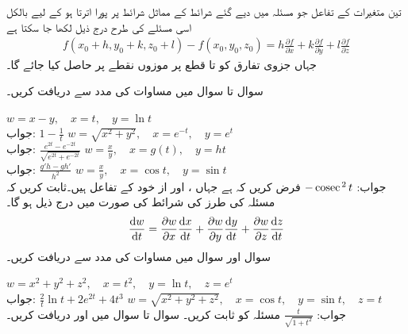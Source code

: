 تین متغیرات کے تفاعل  جو مسئلہ  میں دیے گئے شرائط کے مماثل شرائط پر پورا اترتا ہو کے لیے بالکل اسی مسئلے کی طرح درج ذیل لکھا جا سکتا ہے
\begin{align}\label{مساوات_الاحصاء_مسئلہ_زنجیری_ت}
f(x_0+h,y_0+k,z_0+l)-f(x_0,y_0,z_0)=h\frac{\partial f}{\partial x}+k\frac{\partial f}{\partial y}+l\frac{\partial f}{\partial z}
\end{align}
جہاں جزوی تفارق کو  تا  قطع پر موزوں نقطے پر حاصل کیا جائے گا۔

سوال  تا سوال  میں مساوات  کی مدد سے  دریافت کریں۔

\quad
$w=x-y,\quad x=t,\quad y=\ln t$\\
جواب:
$1-\tfrac{1}{t}$
\quad
$w=\sqrt{x^2+y^2},\quad x=e^{-t},\quad y=e^{t}$\\
جواب:
$\tfrac{e^{2t}-e^{-2t}}{\sqrt{e^{2t}+e^{-2t}}}$
\quad
$w=\tfrac{x}{y},\quad x=g(t),\quad y=h{t}$\\
جواب:
$\tfrac{g'h-gh'}{h^2}$
\quad
$w=\tfrac{x}{y},\quad x=\cos t,\quad y=\sin t$\\
جواب:
$-\operatorname{cosec}^{\,2} t$
فرض کریں کہ  ہے جہاں ،  اور  از خود  کے تفاعل ہیں۔ثابت کریں کہ مسئلہ  کی طرز کی شرائط کی صورت میں درج ذیل ہو گا۔
\begin{align}\label{مساوات_الاحصاء_زنجیری_تین_متغیرات}
\frac{\dif w}{\dif t}=\frac{\partial w}{\partial x}\frac{\dif x}{\dif t}+\frac{\partial w}{\partial y}\frac{\dif y}{\dif t}+\frac{\partial w}{\partial z}\frac{\dif z}{\dif t}
\end{align}
سوال  اور سوال  میں مساوات  کی مدد سے  دریافت کریں۔

\quad
$w=x^2+y^2+z^2,\quad x=t^2,\quad y=\ln t,\quad z=e^t$\\
جواب:
$\tfrac{2}{t}\ln t+2e^{2t}+4t^3$
\quad
$w=\sqrt{x^2+y^2+z^2},\quad x=\cos t,\quad y=\sin t,\quad z=t$\\
جواب:
$\tfrac{t}{\sqrt{1+t^2}}$
مسئلہ  کو ثابت کریں۔
سوال  تا سوال  میں  اور  دریافت کریں۔

